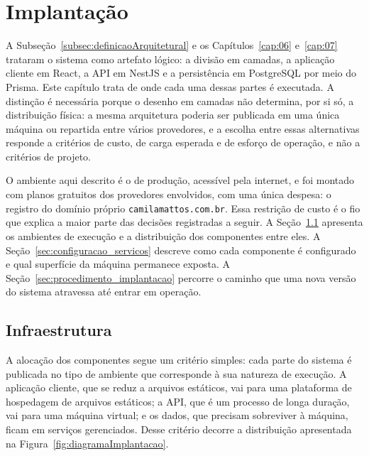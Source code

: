\chapter{Implantação}
\label{cap:09}


A Subseção~\ref{subsec:definicaoArquitetural} e os Capítulos~\ref{cap:06} e~\ref{cap:07} trataram o sistema como artefato lógico: a divisão em camadas, a aplicação cliente em React, a API em NestJS e a persistência em PostgreSQL por meio do Prisma. Este capítulo trata de onde cada uma dessas partes é executada. A distinção é necessária porque o desenho em camadas não determina, por si só, a distribuição física: a mesma arquitetura poderia ser publicada em uma única máquina ou repartida entre vários provedores, e a escolha entre essas alternativas responde a critérios de custo, de carga esperada e de esforço de operação, e não a critérios de projeto.

O ambiente aqui descrito é o de produção, acessível pela internet, e foi montado com planos gratuitos dos provedores envolvidos, com uma única despesa: o registro do domínio próprio \texttt{camilamattos.com.br}. Essa restrição de custo é o fio que explica a maior parte das decisões registradas a seguir. A Seção~\ref{sec:infraestrutura} apresenta os ambientes de execução e a distribuição dos componentes entre eles. A Seção~\ref{sec:configuracao_servicos} descreve como cada componente é configurado e qual superfície da máquina permanece exposta. A Seção~\ref{sec:procedimento_implantacao} percorre o caminho que uma nova versão do sistema atravessa até entrar em operação.

\section{Infraestrutura}
\label{sec:infraestrutura}

A alocação dos componentes segue um critério simples: cada parte do sistema é publicada no tipo de ambiente que corresponde à sua natureza de execução. A aplicação cliente, que se reduz a arquivos estáticos, vai para uma plataforma de hospedagem de arquivos estáticos; a API, que é um processo de longa duração, vai para uma máquina virtual; e os dados, que precisam sobreviver à máquina, ficam em serviços gerenciados. Desse critério decorre a distribuição apresentada na Figura~\ref{fig:diagramaImplantacao}.

